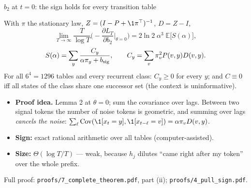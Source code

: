 \begin{frame}{$b_2$ at $t=0$: the sign holds for every transition table}
\footnotesize
\begin{proposition}
With $\pi$ the stationary law, $Z=(I-P+\1\pi^\top)^{-1}$, $D=Z-I$,
\[
\lim_{T\to\infty}\frac{T}{\log T}\Big(-\frac{\partial L_T}{\partial b_2}\Big|_{\theta=0}\Big)=2\ln2\;\alpha^3\;\mathbb E\big[S(\alpha)\big],
\]
\[
S(\alpha)=\sum_y\frac{C_y}{\alpha\pi_y+b_{\rm sig}},\qquad C_y=\sum_v\pi_v^2P(v,y)D(v,y).
\]
For all $6^4=1296$ tables and every recurrent class: $C_y\ge0$ for every $y$; and $C\equiv0$ iff all states of the class share one
successor set (the context is uninformative).
\end{proposition}
\begin{itemize}
\item \textbf{Proof idea.} Lemma 2 at $\theta=0$; sum the covariance over lags. Between two signal tokens the number of noise
tokens is geometric, and summing over lags \emph{cancels the noise}: $\sum_{\ell}\mathrm{Cov}(\1[x_t=y],\1[x_{t-\ell}=v])=\alpha\pi_vD(v,y)$.
\item \textbf{Sign:} exact rational arithmetic over all tables (computer-assisted).
\item \textbf{Size:} $\Theta(\log T/T)$ --- weak, because $h_j$ dilutes ``came right after my token'' over the whole prefix.
\end{itemize}
{\footnotesize\color{gray}Full proof: \texttt{proofs/7\_complete\_theorem.pdf}, part (ii); \texttt{proofs/4\_pull\_sign.pdf}.}
\end{frame}

